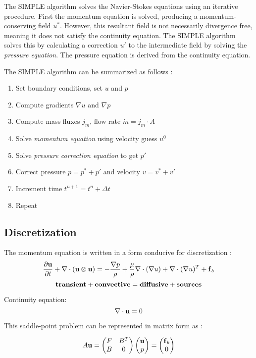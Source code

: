 \documentclass[12pt]{article}
\newcommand{\vb}[1]{\text{\textbf{#1}}}
\begin{document}
The SIMPLE algorithm solves the Navier-Stokes equations using an iterative procedure. First the momentum equation is solved, producing a momentum-conserving field $u^*$. However, this resultant field is not necessarily divergence free, meaning it does not satisfy the continuity equation. The SIMPLE algorithm solves this by calculating a correction $u'$ to the intermediate field by solving the \textit{pressure equation}. The pressure equation is derived from the continuity equation.

The SIMPLE algorithm can be summarized as follows \cite{mou, cws}:

\begin{enumerate}
\item Set boundary conditions, set $u$ and $p$
\item Compute gradients $\nabla u$ and $\nabla p$
\item Compute mass fluxes $j_m$, flow rate $\dot m = j_m \cdot A$
\item Solve \textit{momentum equation} using velocity guess $u^0$
\item Solve \textit{pressure correction equation} to get $p'$
\item Correct pressure $p = p^* + p'$ and velocity $v = v^* + v'$
\item Increment time $t^{n+1} = t^n + \Delta t$
\item Repeat
\end{enumerate}

\subsection{Discretization}

\noindent

The momentum equation is written in a form conducive for discretization \cite{mou}:
$$
\frac{\partial \vb u}{\partial t} + \nabla \cdot (\vb u \otimes \vb u) = - \frac{\nabla p}{\rho} + \frac{\mu}{\rho} \nabla \cdot (\nabla u) + \nabla \cdot (\nabla u)^T + \vb f_b
$$
$$
\vb{transient} + \vb{convective} =  \vb{diffusive} + \vb{sources}
$$

Continuity equation:
$$
\nabla \cdot \vb u = 0
$$

This saddle-point problem can be represented in matrix form as \cite{mou, qs}:

$$
A \vb u = \begin{pmatrix}
  F & B^T \\
  B & 0
\end{pmatrix}
\begin{pmatrix}
  \vb u \\
  p
\end{pmatrix} =
\begin{pmatrix}
  \vb f_b \\
  0
\end{pmatrix}
$$
\end{document}
